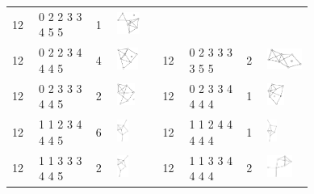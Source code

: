 \begin{footnotesize}
\begin{longtable}{
        m{0.05\linewidth} m{0.15\linewidth} m{0.05\linewidth} m{0.12\linewidth} |
        m{0.05\linewidth} m{0.15\linewidth} m{0.05\linewidth} m{0.12\linewidth}
    }
12 & 0 2 2 3 3 4 5 5 & 1 & \includegraphics[height=0.7151cm]{15-universal-graphs/img/degree-sequences-example-graphs/graph-4-8-7}\\
12 & 0 2 2 3 4 4 4 5 & 4 & \includegraphics[height=0.7151cm]{15-universal-graphs/img/degree-sequences-example-graphs/graph-4-8-8} &
12 & 0 2 3 3 3 3 5 5 & 2 & \includegraphics[height=0.7151cm]{15-universal-graphs/img/degree-sequences-example-graphs/graph-4-8-9}\\
12 & 0 2 3 3 3 4 4 5 & 2 & \includegraphics[height=0.7151cm]{15-universal-graphs/img/degree-sequences-example-graphs/graph-4-8-10} &
12 & 0 2 3 3 4 4 4 4 & 1 & \includegraphics[height=0.7151cm]{15-universal-graphs/img/degree-sequences-example-graphs/graph-4-8-11}\\
12 & 1 1 2 3 4 4 4 5 & 6 & \includegraphics[height=0.7151cm]{15-universal-graphs/img/degree-sequences-example-graphs/graph-4-8-12} &
12 & 1 1 2 4 4 4 4 4 & 1 & \includegraphics[height=0.7151cm]{15-universal-graphs/img/degree-sequences-example-graphs/graph-4-8-13}\\
12 & 1 1 3 3 3 4 4 5 & 2 & \includegraphics[height=0.7151cm]{15-universal-graphs/img/degree-sequences-example-graphs/graph-4-8-14} &
12 & 1 1 3 3 4 4 4 4 & 2 & \includegraphics[height=0.7151cm]{15-universal-graphs/img/degree-sequences-example-graphs/graph-4-8-15}\\

\end{longtable}
\end{footnotesize}
